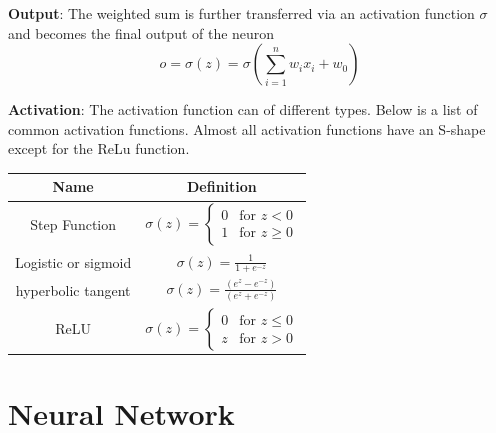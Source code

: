 \documentclass[12pt, oneside]{article}
\begin{document}
\textbf{Output}: The weighted sum is further transferred via an activation function $\sigma$ and becomes the final output of the neuron
\begin{equation}
o=\sigma(z)=\sigma(\sum\limits_{i=1}^{n}w_i x_i+w_0)
\end{equation}

\textbf{Activation}: The activation function can of different types.  Below is a list of common activation functions. Almost all activation functions have an S-shape except for the ReLu function.
\begin{center}
\bgroup
\def\arraystretch{2.5}%
\begin{tabular}{c|c} 
Name & Definition\\
\hline
Step Function & $\sigma (z)={\begin{cases}0&{\text{for }}z<0\\1&{\text{for }}z\geq 0\end{cases}}$\\
\hline
Logistic or sigmoid & $\sigma(z)={\frac {1}{1+e^{-z}}}$\\
\hline
hyperbolic tangent &$\sigma(z)={\frac {(e^{z}-e^{-z})}{(e^{z}+e^{-z})}}$\\
\hline
ReLU & $\sigma(z)=\begin{cases}0&{\text{for }}z\leq 0\\z&{\text{for }}z>0\end{cases}$
\end{tabular}
\egroup
\end{center}


\section{Neural Network}
\end{document}
